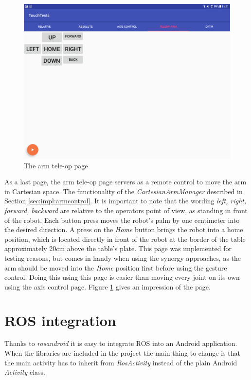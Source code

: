 \begin{figure}
	\caption{\label{fig:ui:teleop}The arm tele-op page}
	\includegraphics[width=0.9\linewidth]{assets/chpt_impl/teleop}
\end{figure}

As a last page, the arm tele-op page servers as a remote control to move the arm in Cartesian space. The functionality of the \textit{CartesianArmManager} described in Section \ref{sec:impl:armcontrol}. It is important to note that the wording \textit{left, right, forward, backward} are relative to the operators point of view, as standing in front of the robot. Each button press moves the robot's palm by one centimeter into the desired direction. A press on the \textit{Home} button brings the robot into a home position, which is located directly in front of the robot at the border of the table approximately 20cm above the table's plate. This page was implemented for testing reasons, but comes in handy when using the synergy approaches, as the arm should be moved into the \textit{Home} position first before using the gesture control. Doing this using this page is easier than moving every joint on its own using the axis control page. Figure \ref{fig:ui:teleop} gives an impression of the page.

\section{ROS integration}

Thanks to \textit{rosandroid} it is easy to integrate ROS into an Android application. When the libraries are included in the project the main thing to change is that the main activity has to inherit from \textit{RosActivity} instead of the plain Android \textit{Activity} class.

